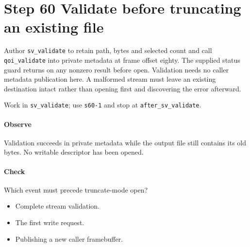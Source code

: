\section{Step 60 Validate before truncating an existing file}\label{qoi-s60}
Author \texttt{sv\_validate} to retain path, bytes and selected count and call \texttt{qoi\_validate} into private metadata at frame offset eighty. The supplied status guard returns on any nonzero result before open. Validation needs no caller metadata publication here. A malformed stream must leave an existing destination intact rather than opening first and discovering the error afterward.

Work in \texttt{sv\_validate}; use \texttt{s60-1} and stop at \texttt{after\_sv\_validate}.

\paragraph{Observe} Validation succeeds in private metadata while the output file still contains its old bytes. No writable descriptor has been opened.

\paragraph{Check} Which event must precede truncate-mode open?
\begin{itemize}
\item[A.] Complete stream validation.
\item[B.] The first write request.
\item[C.] Publishing a new caller framebuffer.
\end{itemize}

